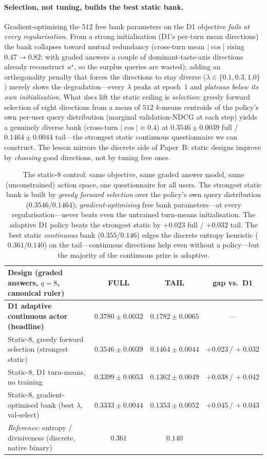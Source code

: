 \documentclass[11pt]{article}
\newcommand{\ustar}{u^{\star}}
\begin{document}
\paragraph{Selection, not tuning, builds the best static bank.} Gradient-optimising the $512$ free bank parameters on
the D1 objective \emph{fails at every regularisation}. From a strong initialisation (D1's per-turn mean directions) the
bank collapses toward mutual redundancy (cross-turn mean $|\cos|$ rising $0.47\!\to\!0.82$: with graded answers a couple
of dominant-taste-axis directions already reconstruct $\ustar$, so the surplus queries are wasted); adding an
orthogonality penalty that forces the directions to stay diverse ($\lambda\in\{0.1,0.3,1.0\}$) merely slows the
degradation---every $\lambda$ peaks at epoch~$1$ and \emph{plateaus below its own initialisation}. What \emph{does} lift
the static ceiling is \emph{selection}: greedy forward selection of eight directions from a menu of $512$ $k$-means
centroids of the policy's own per-user query distribution (marginal validation-NDCG at each step) yields a genuinely
diverse bank (cross-turn $|\cos|\approx0.4$) at $\mathbf{0.3546\pm0.0039}$ full / $\mathbf{0.1464\pm0.0044}$ tail---the
strongest static continuous questionnaire we can construct. The lesson mirrors the discrete side of Paper~B: static
designs improve by \emph{choosing} good directions, not by tuning free ones.

\begin{table}[h]\centering
\begin{tabular}{lccc}
\toprule
Design (graded answers, $q{=}8$, canonical ruler) & FULL & TAIL & gap vs.\ D1 \\
\midrule
\textbf{D1 adaptive continuous actor (headline)} & $\mathbf{0.3780\pm0.0032}$ & $\mathbf{0.1782\pm0.0065}$ & --- \\
Static-8, greedy forward selection (strongest static) & $0.3546\pm0.0039$ & $0.1464\pm0.0044$ & $+0.023\,/\,+0.032$ \\
Static-8, D1 turn-means, no training & $0.3399\pm0.0053$ & $0.1362\pm0.0049$ & $+0.038\,/\,+0.042$ \\
Static-8, gradient-optimised bank (best $\lambda$, val-select) & $0.3333\pm0.0044$ & $0.1353\pm0.0052$ & $+0.045\,/\,+0.043$ \\
\midrule
\emph{Reference:} entropy / divisiveness (discrete, native binary) & $0.361$ & $0.140$ & \\
\bottomrule
\end{tabular}
\caption{The static-8 control: same objective, same graded answer model, same (unconstrained) action space, one
questionnaire for all users. The strongest static bank is built by \emph{greedy forward selection} over the policy's own
query distribution ($0.3546/0.1464$); \emph{gradient-optimising} free bank parameters---at every regularisation---never
beats even the untrained turn-means initialisation. The adaptive D1 policy beats the strongest static by $+0.023$ full /
$+0.032$ tail. The best static \emph{continuous} bank ($0.355/0.146$) edges the discrete entropy heuristic
($0.361/0.140$) on the tail---continuous directions help even without a policy---but the majority of the continuous
prize is adaptive.}\label{tab:static8}
\end{table}
\end{document}
